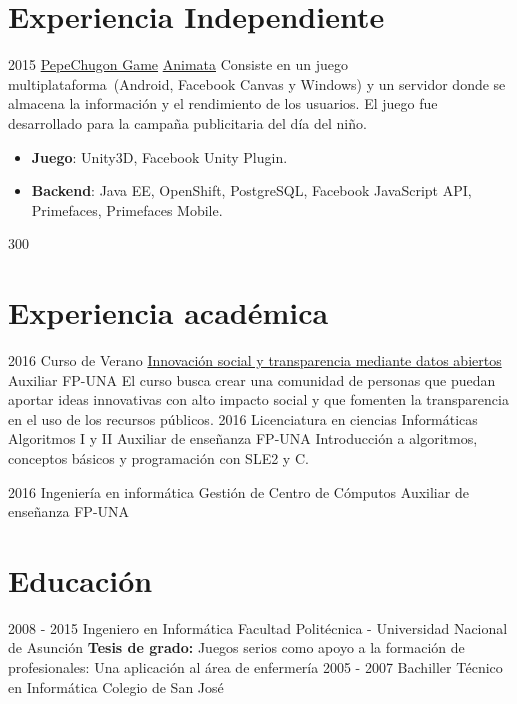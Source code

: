 \documentclass[]{friggeri-cv}
\begin{document}
\section{Experiencia Independiente}
\proyectof
    {2015}
    {\href{https://apps.facebook.com/pechugon_pepe}{PepeChugon Game}}
    {\href{http://www.animata.com.py/}{Animata}}
    {Consiste en un juego multiplataforma~(Android, Facebook Canvas y Windows)
        y un servidor donde se almacena la información y el rendimiento de los
        usuarios. El juego fue desarrollado para la campaña publicitaria del día
        del niño.}
    {\begin{itemize}
            \item \textbf{Juego}: Unity3D, Facebook Unity Plugin.
            \item \textbf{Backend}: Java EE, OpenShift, PostgreSQL, Facebook
                JavaScript API, Primefaces, Primefaces Mobile.
        \end{itemize}}
    {300}
        

\section{Experiencia académica}
\clase
    {2016}
    {Curso de Verano}
    {\href{http://www.pol.una.py/cursosverano/index.php?option=com_content&view=article&layout=edit&id=91}{Innovación
            social y transparencia mediante datos abiertos}} 
    {Auxiliar}
    {FP-UNA}
    {El curso busca crear una comunidad de personas que puedan aportar ideas
        innovativas con alto impacto social y que fomenten la transparencia en
        el uso de los recursos públicos. }
\clase
    {2016}
    {Licenciatura en ciencias Informáticas}
    {Algoritmos I y II} 
    {Auxiliar de enseñanza}
    {FP-UNA}
    {Introducción a algoritmos, conceptos básicos y programación con SLE2 y C.}

\clase
    {2016}
    {Ingeniería en informática}
    {Gestión de Centro de Cómputos} 
    {Auxiliar de enseñanza}
    {FP-UNA}
    {}

\section{Educación}
\begin{entrylist}
  \educacion
    {2008 - 2015}
    {Ingeniero en Informática}
    {Facultad Politécnica - Universidad Nacional de Asunción}
    {\textbf{Tesis de grado:} Juegos serios como apoyo a la formación de profesionales: Una aplicación al área de enfermería}
  \educacion
    {2005 - 2007}
    {Bachiller Técnico en Informática}
    {Colegio de San José}
    {}
\end{entrylist}
\end{document}
